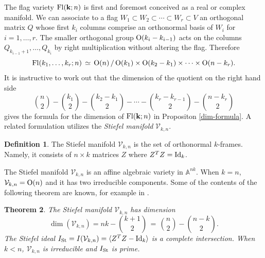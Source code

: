 \documentclass[12pt]{extarticle}
\newtheorem{theorem}{Theorem}
\theoremstyle{definition}
\newtheorem{definition}[theorem]{Definition}
\numberwithin{theorem}{section}
\begin{document}
The flag variety ${\rm Fl}({\bf k};n)$ is first and foremost conceived as a real or complex manifold. We can associate to a flag $W_1 \subset W_2 \subset \cdots \subset W_r \subset V$ an orthogonal matrix $Q$ whose first $k_i$ columns comprise an orthonormal basis of $W_i$ for $i = 1, \ldots, r$. The smaller orthogonal group ${\rm O}(k_i-k_{i-1})$ acts on the columns $Q_{k_{i-1}+1}, \ldots, Q_{k_i}$ by right multiplication without altering the flag. Therefore
$${\rm Fl}(k_1, \ldots, k_r; n) \, \simeq \, 
{\rm O}(n) \, / \, {\rm O}(k_1) \times {\rm O}(k_2-k_1) \times \cdots \times {\rm O}(n-k_r).$$
It is instructive to work out that the dimension of the quotient on the right hand side 
$$\binom{n}{2} - \binom{k_1}{2} - \binom{k_2-k_1}{2} - \cdots - \binom{k_r-k_{r-1}}{2} - \binom{n-k_r}{2}$$
gives the formula for the dimension of ${\rm Fl}({\bf k};n)$ in Propositon \ref{dim-formula}. A related formulation utilizes the {\it Stiefel manifold} $\mathcal V_{k,n}$. 
\begin{definition} The Stiefel manifold $\mathcal V_{k,n}$ is the set of orthonormal $k$-frames. Namely, it consists of $n \times k$ matrices $Z$ where $Z^TZ = {\rm Id}_k$.
\end{definition}
The Stiefel manifold $\mathcal V_{k,n}$ is an affine algebraic variety in $\mathbb{A}^{nk}$.
When $k=n$, $\mathcal V_{k,n} = {\rm O}(n)$ and it has two irreducible components. 
Some of the contents of the following theorem are known, for example in \cite[Lemma 2.4]{BG}.
\begin{theorem} \label{thm:stiefel}
The Stiefel manifold $\mathcal V_{k,n}$ has dimension
$$\dim(\mathcal V_{k,n}) = nk - \binom{k+1}{2} \, = \, \binom{n}{2} - \binom{n-k}{2}. $$  
The Stiefel ideal
$I_{\rm St} = I(\mathcal V_{k,n}) = \langle Z^TZ - {\rm Id}_k \rangle$ is a complete intersection.
When $k < n$, $\mathcal V_{k,n}$ is irreducible and $I_{\rm St}$ is prime. 
\end{theorem}
\end{document}

